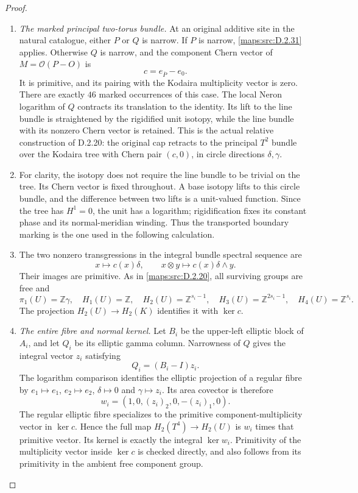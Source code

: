 \begin{proof}
\begin{enumerate}[label=\arabic*.,leftmargin=*]
\item \emph{The marked principal two-torus bundle.}
At an original additive site in the natural catalogue, either
$P$ or $Q$ is narrow. If $P$ is narrow, \ref{maps:src:D.2.31} applies.
Otherwise $Q$ is narrow, and the component Chern vector of
$M=\mathcal O(P-O)$ is
\[
 c=e_{\overline P}-e_0.
\]
It is primitive, and its pairing with the Kodaira
multiplicity vector is zero. There are exactly $46$ marked
occurrences of this case. The local Neron logarithm of $Q$
contracts its translation to the identity. Its lift to the
line bundle is straightened by the rigidified unit isotopy,
while the line bundle with its nonzero Chern vector is
retained. This is the actual relative construction of
D.2.20: the original cap retracts to the principal $T^2$
bundle over the Kodaira tree with Chern pair $(c,0)$, in
circle directions $\delta,\gamma$.

\item For clarity, the isotopy does not require the line bundle
to be trivial on the tree. Its Chern vector is fixed
throughout. A base isotopy lifts to this circle bundle,
and the difference between two lifts is a unit-valued
function. Since the tree has $H^1=0$, the unit has a
logarithm; rigidification fixes its constant phase and its
normal-meridian winding. Thus the transported boundary
marking is the one used in the following calculation.

\item The two nonzero transgressions in the integral bundle
spectral sequence are
\[
 x\longmapsto c(x)\delta,\qquad
 x\otimes y\longmapsto c(x)\delta\wedge y.
\]
Their images are primitive. As in \ref{maps:src:D.2.20}, all surviving
groups are free and
\[
 \pi_1(U)=\mathbb Z\gamma,\quad
 H_1(U)=\mathbb Z,\quad H_2(U)=\mathbb Z^{s_i-1},\quad
 H_3(U)=\mathbb Z^{2s_i-1},\quad H_4(U)=\mathbb Z^{s_i}.
                                                               \tag{D.OC4}\label{maps:eq:D.OC4}
\]
The projection $H_2(U)\to H_2(K)$ identifies it with
$\ker c$.

\item \emph{The entire fibre and normal kernel.}
Let $B_i$ be the upper-left elliptic block of $A_i$, and
let $Q_i$ be its elliptic gamma column. Narrowness of $Q$
gives the integral vector $z_i$ satisfying
\[
 Q_i=(B_i-I)z_i.
\]
The logarithm comparison identifies the elliptic projection
of a regular fibre by
$e_1\mapsto e_1$, $e_2\mapsto e_2$, $\delta\mapsto0$ and
$\gamma\mapsto z_i$. Its area covector is therefore
\[
 w_i=(1,0,(z_i)_2,0,-(z_i)_1,0).                            \tag{D.OC5}\label{maps:eq:D.OC5}
\]
The regular elliptic fibre specializes to the primitive
component-multiplicity vector in $\ker c$. Hence the full
map $H_2(T^4)\to H_2(U)$ is $w_i$ times that primitive
vector. Its kernel is exactly the integral $\ker w_i$.
Primitivity of the multiplicity vector inside $\ker c$
is checked directly, and also follows from its primitivity
in the ambient free component group.


\end{enumerate}
\end{proof}
